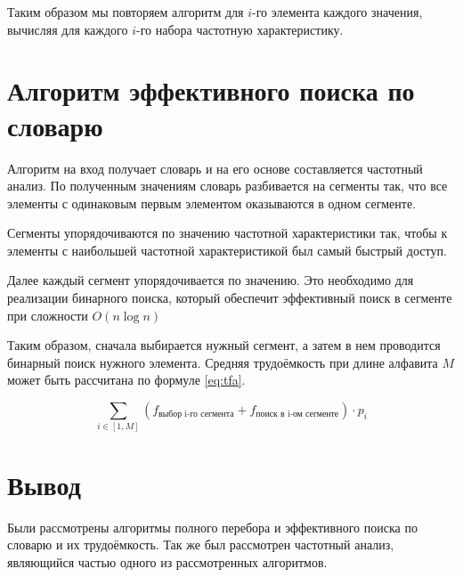 Таким образом мы повторяем алгоритм для $i$-го элемента каждого значения, вычисляя для каждого $i$-го набора частотную характеристику.

\section{Алгоритм эффективного поиска по словарю}

Алгоритм на вход получает словарь и на его основе составляется частотный анализ. По полученным значениям словарь разбивается на сегменты так, что все элементы с одинаковым первым элементом оказываются в одном сегменте. 

Сегменты упорядочиваются по значению частотной характеристики так, чтобы к элементы с наибольшей частотной характеристикой был самый быстрый доступ. 

Далее каждый сегмент упорядочивается по значению. Это необходимо для реализации бинарного поиска, который обеспечит эффективный поиск в сегменте при сложности $O(n\log n)$

Таким образом, сначала выбирается нужный сегмент, а затем в нем проводится бинарный поиск нужного элемента. Средняя трудоёмкость при длине алфавита $M$ может быть рассчитана по формуле \ref{eq:tfa}. 

\begin{equation} \label{eq:tfa}
	\sum\limits_{i\in[1, M]} (f_{\text{выбор i-го сегмента}}+f_{\text{поиск в i-ом сегменте}}) \cdot p_i
\end{equation}


\section*{Вывод}

Были рассмотрены алгоритмы полного перебора и эффективного поиска по словарю и их трудоёмкость. Так же был рассмотрен частотный анализ, являющийся частью одного из рассмотренных алгоритмов.
